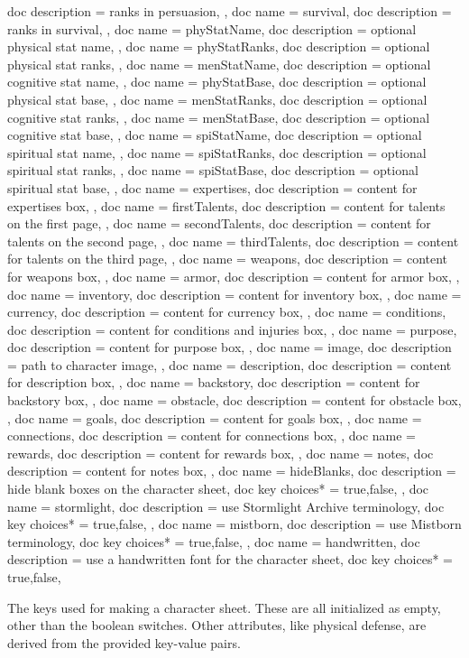 \documentclass[article,ariandor]{plotweaver}
\begin{document}
\begin{docKeys}[
  doc keypath = charsheet,
  doc parameter = {=\meta{text}},
]
{{  doc description = ranks in persuasion,
},
{
  doc name = survival,
  doc description = ranks in survival,
},
{
  doc name = phyStatName,
  doc description = optional physical stat name,
},
{
  doc name = phyStatRanks,
  doc description = optional physical stat ranks,
},
{
  doc name = menStatName,
  doc description = optional cognitive stat name,
},
{
  doc name = phyStatBase,
  doc description = optional physical stat base,
},
{
  doc name = menStatRanks,
  doc description = optional cognitive stat ranks,
},
{
  doc name = menStatBase,
  doc description = optional cognitive stat base,
},
{
  doc name = spiStatName,
  doc description = optional spiritual stat name,
},
{
  doc name = spiStatRanks,
  doc description = optional spiritual stat ranks,
},
{
  doc name = spiStatBase,
  doc description = optional spiritual stat base,
},
{
  doc name = expertises,
  doc description = content for expertises box,
},
{
  doc name = firstTalents,
  doc description = content for talents on the first page,
},
{
  doc name = secondTalents,
  doc description = content for talents on the second page,
},
{
  doc name = thirdTalents,
  doc description = content for talents on the third page,
},
{
  doc name = weapons,
  doc description = content for weapons box,
},
{
  doc name = armor,
  doc description = content for armor box,
},
{
  doc name = inventory,
  doc description = content for inventory box,
},
{
  doc name = currency,
  doc description = content for currency box,
},
{
  doc name = conditions,
  doc description = content for conditions and injuries box,
},
{
  doc name = purpose,
  doc description = content for purpose box,
},
{
  doc name = image,
  doc description = path to character image,
},
{
  doc name = description,
  doc description = content for description box,
},
{
  doc name = backstory,
  doc description = content for backstory box,
},
{
  doc name = obstacle,
  doc description = content for obstacle box,
},
{
  doc name = goals,
  doc description = content for goals box,
},
{
  doc name = connections,
  doc description = content for connections box,
},
{
  doc name = rewards,
  doc description = content for rewards box,
},
{
  doc name = notes,
  doc description = content for notes box,
},
{
  doc name = hideBlanks,
  doc description = hide blank boxes on the character sheet,
  doc key choices* = {true,false},
},
{
  doc name = stormlight,
  doc description = use Stormlight Archive terminology,
  doc key choices* = {true,false},
},
{
  doc name = mistborn,
  doc description = use Mistborn terminology,
  doc key choices* = {true,false},
},
{
  doc name = handwritten,
  doc description = use a handwritten font for the character sheet,
  doc key choices* = {true,false},
}
}

The keys used for making a character sheet. These are all initialized as empty, other than the boolean switches. Other attributes, like physical defense, are derived from the provided key-value pairs.
\end{docKeys}
\end{document}
